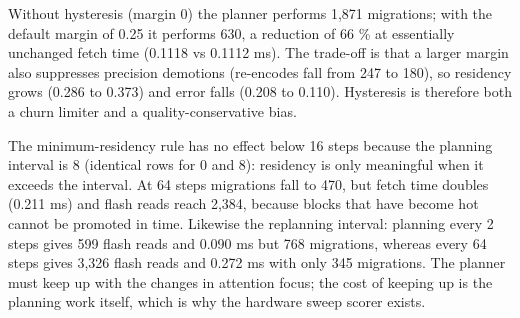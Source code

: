 \documentclass[12pt,a4paper]{report}
\begin{document}
Without hysteresis (margin 0) the planner performs 1,871 migrations; with the default margin of 0.25 it performs 630, a reduction of 66 \% at essentially unchanged fetch time (0.1118 vs 0.1112 ms). The trade-off is that a larger margin also suppresses precision demotions (re-encodes fall from 247 to 180), so residency grows (0.286 to 0.373) and error falls (0.208 to 0.110). Hysteresis is therefore both a churn limiter and a quality-conservative bias.

The minimum-residency rule has no effect below 16 steps because the planning interval is 8 (identical rows for 0 and 8): residency is only meaningful when it exceeds the interval. At 64 steps migrations fall to 470, but fetch time doubles (0.211 ms) and flash reads reach 2,384, because blocks that have become hot cannot be promoted in time. Likewise the replanning interval: planning every 2 steps gives 599 flash reads and 0.090 ms but 768 migrations, whereas every 64 steps gives 3,326 flash reads and 0.272 ms with only 345 migrations. The planner must keep up with the changes in attention focus; the cost of keeping up is the planning work itself, which is why the hardware sweep scorer exists.
\end{document}
